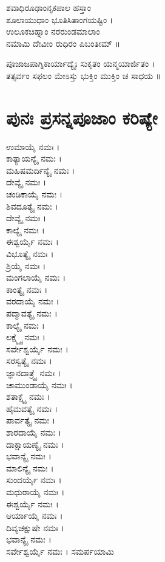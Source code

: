 ಶವಾಧಿರೂಢಾಂನೃಕಪಾಲ ಹಸ್ತಾಂ\\ ಶೂಲಾಯುಧಾಂ ಭೂತಿಸಿತಾಂಗಯಷ್ಟಿಂ ।\\
ಉಲೂಕಚಿಹ್ನಾಂ ನರರುಂಡಮಾಲಾಂ\\ ನಮಾಮಿ ದೇವೀಂ ರುಧಿರಂ ಪಿಬಂತೀಮ್ ॥

ಪೂಜಾಜಪಾಗ್ನಿಕಾರ್ಯಾದ್ಯೈಃ ಸುಕೃತಂ ಯನ್ಮಯಾರ್ಜಿತಂ ।\\ತತ್ಸರ್ವಂ ಸಫಲಂ ಮೇಽಸ್ತು ಭುಕ್ತಿಂ ಮುಕ್ತಿಂ ಚ ಸಾಧಯ ॥
\newpage
\section{ಪುನಃ ಪ್ರಸನ್ನಪೂಜಾಂ ಕರಿಷ್ಯೇ}
ಉಮಾಯೈ ನಮಃ । \\
ಕಾತ್ಯಾಯನ್ಯೈ ನಮಃ । \\
ಮಹಿಷಮರ್ದಿನ್ಯೈ ನಮಃ । \\
ದೇವ್ಯೈ ನಮಃ । \\
ಚಂಡಿಕಾಯೈ ನಮಃ । \\
ಶಿವದೂತ್ಯೈ ನಮಃ । \\
ದೇವ್ಯೈ ನಮಃ । \\
ಕಾಲ್ಯೈ ನಮಃ । \\
ಈಶ್ವರ್ಯೈ ನಮಃ । \\
ವಿಭೂತ್ಯೈ ನಮಃ । \\
ಶ್ರಿಯೈ ನಮಃ । \\
ಮಂಗಲಾಯೈ ನಮಃ । \\
ಕಾಂತ್ಯೈ ನಮಃ । \\
ವರದಾಯೈ ನಮಃ । \\
ಪದ್ಮಾವತ್ಯೈ ನಮಃ । \\
ಕಾಲ್ಯೈ ನಮಃ । \\
ಲಕ್ಷ್ಮ್ಯೈ ನಮಃ । \\
ಸರ್ವೇಶ್ವರ್ಯೈ ನಮಃ । \\
ಸರಸ್ವತ್ಯೈ ನಮಃ । \\
ಜ್ಞಾನದಾತ್ರ್ಯೈ ನಮಃ । \\
ಚಾಮುಂಡಾಯೈ ನಮಃ । \\
ಶತಾಕ್ಷ್ಯೈ ನಮಃ । \\
ಹೈಮವತ್ಯೈ ನಮಃ । \\
ಪಾರ್ವತ್ಯೈ ನಮಃ । \\
ಶಾರದಾಯೈ ನಮಃ । \\
ದಾಕ್ಷಾಯಣ್ಯೈ ನಮಃ । \\
ಭವಾನ್ಯೈ ನಮಃ । \\
ಮಾಲಿನ್ಯೈ ನಮಃ । \\
ಸುಂದರ್ಯೈ ನಮಃ । \\
ಮಧುರಾಯೈ ನಮಃ । \\
ಈಶ್ವರ್ಯೈ ನಮಃ । \\
ಆರ್ಯಾಯೈ ನಮಃ । \\
ದಿವ್ಯಚಕ್ಷುಷೇ ನಮಃ । \\
ಭವಾನ್ಯೈ ನಮಃ । \\
ಸರ್ವೇಶ್ವರ್ಯೈ ನಮಃ ।  ಸಮರ್ಪಯಾಮಿ

